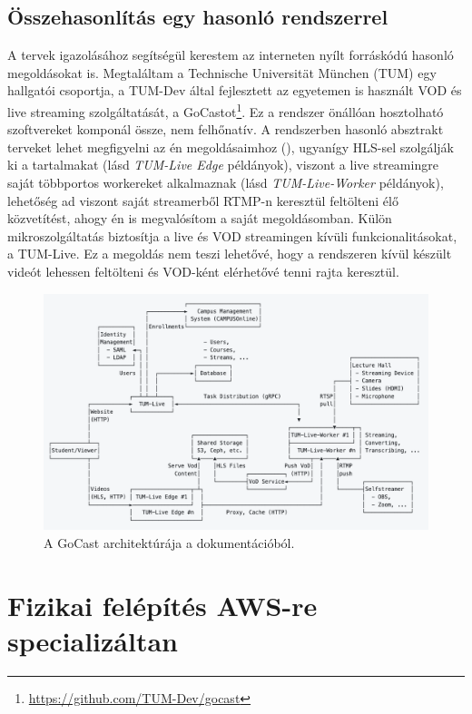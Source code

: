 \subsection{Összehasonlítás egy hasonló rendszerrel}

A tervek igazolásához segítségül kerestem az interneten nyílt forráskódú hasonló megoldásokat is. Megtaláltam a Technische Universität München (TUM) egy hallgatói csoportja, a TUM-Dev által fejlesztett az egyetemen is használt VOD és live streaming szolgáltatását, a GoCastot\footnote{\url{https://github.com/TUM-Dev/gocast}}. Ez a rendszer önállóan hosztolható szoftvereket komponál össze, nem felhőnatív. A rendszerben hasonló absztrakt terveket lehet megfigyelni az én megoldásaimhoz (), ugyanígy HLS-sel szolgálják ki a tartalmakat (lásd \emph{TUM-Live Edge} példányok), viszont a live streamingre saját többportos workereket alkalmaznak (lásd \emph{TUM-Live-Worker} példányok), lehetőség ad viszont saját streamerből RTMP-n keresztül feltölteni élő közvetítést, ahogy én is megvalósítom a saját megoldásomban. Külön mikroszolgáltatás biztosítja a live és VOD streamingen kívüli funkcionalitásokat, a TUM-Live. Ez a megoldás nem teszi lehetővé, hogy a rendszeren kívül készült videót lehessen feltölteni és VOD-ként elérhetővé tenni rajta keresztül.

\begin{figure}[h]
	\centering
	\includegraphics[width=140mm, keepaspectratio]{figures/gocast.png}
	\caption{A GoCast architektúrája a dokumentációból.}
	\label{fig:gocast}
\end{figure}

\section{Fizikai felépítés AWS-re specializáltan}

